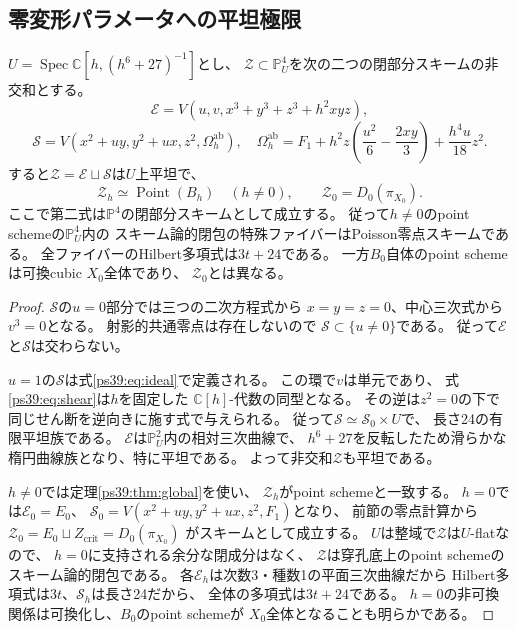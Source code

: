 \subsection{零変形パラメータへの平坦極限}
\begin{theorem}
\label{ps39:thm:flat-limit}
$U=\operatorname{Spec}\mathbb C[h,(h^6+27)^{-1}]$とし、
$\mathcal Z\subset\mathbb P^4_U$を次の二つの閉部分スキームの非交和とする。
\[
\mathcal E=V(u,v,x^3+y^3+z^3+h^2xyz),
\]
\[
\mathcal S=V(x^2+uy,y^2+ux,z^2,\Omega_h^{\mathrm{ab}}),
\quad
\Omega_h^{\mathrm{ab}}=
F_1+h^2z\left(\frac{u^2}{6}-\frac{2xy}{3}\right)
+\frac{h^4u}{18}z^2.
\]
すると$\mathcal Z=\mathcal E\sqcup\mathcal S$は$U$上平坦で、
\[
\boxed{\quad
\mathcal Z_h\simeq\operatorname{Point}(B_h)\quad(h\ne0),
\qquad
\mathcal Z_0=D_0(\pi_{X_0}).
\quad}
\tag{PS40}\label{ps39:eq:flat}
\]
ここで第二式は$\mathbb P^4$の閉部分スキームとして成立する。
従って$h\ne0$のpoint schemeの$\mathbb P^4_U$内の
スキーム論的閉包の特殊ファイバーはPoisson零点スキームである。
全ファイバーのHilbert多項式は$3t+24$である。
一方$B_0$自体のpoint schemeは可換cubic $X_0$全体であり、
$\mathcal Z_0$とは異なる。
\end{theorem}
\begin{proof}
$\mathcal S$の$u=0$部分では三つの二次方程式から
$x=y=z=0$、中心三次式から$v^3=0$となる。
射影的共通零点は存在しないので
$\mathcal S\subset\{u\ne0\}$である。
従って$\mathcal E$と$\mathcal S$は交わらない。

$u=1$の$\mathcal S$は式\eqref{ps39:eq:ideal}で定義される。
この環で$v$は単元であり、
式\eqref{ps39:eq:shear}は$h$を固定した
$\mathbb C[h]$-代数の同型となる。
その逆は$z^2=0$の下で同じせん断を逆向きに施す式で与えられる。
従って$\mathcal S\simeq\mathcal S_0\times U$で、
長さ24の有限平坦族である。
$\mathcal E$は$\mathbb P^2_U$内の相対三次曲線で、
$h^6+27$を反転したため滑らかな楕円曲線族となり、特に平坦である。
よって非交和$\mathcal Z$も平坦である。

$h\ne0$では定理\ref{ps39:thm:global}を使い、
$\mathcal Z_h$がpoint schemeと一致する。
$h=0$では$\mathcal E_0=E_0$、
$\mathcal S_0=V(x^2+uy,y^2+ux,z^2,F_1)$となり、
前節の零点計算から
$\mathcal Z_0=E_0\sqcup Z_{\mathrm{crit}}=D_0(\pi_{X_0})$
がスキームとして成立する。
$U$は整域で$\mathcal Z$は$U$-flatなので、
$h=0$に支持される余分な閉成分はなく、
$\mathcal Z$は穿孔底上のpoint schemeのスキーム論的閉包である。
各$\mathcal E_h$は次数3・種数1の平面三次曲線だから
Hilbert多項式は$3t$、$\mathcal S_h$は長さ24だから、
全体の多項式は$3t+24$である。
$h=0$の非可換関係は可換化し、$B_0$のpoint schemeが
$X_0$全体となることも明らかである。
\end{proof}

